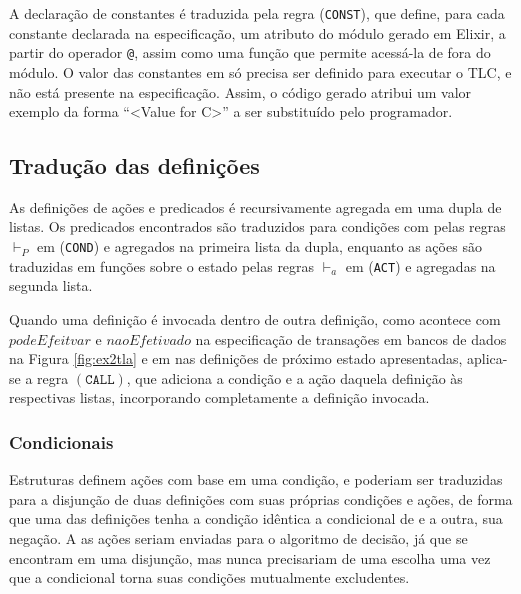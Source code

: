 A declaração de constantes é traduzida pela regra (\texttt{CONST}), que define,
para cada constante declarada na especificação, um atributo do módulo gerado em
Elixir, a partir do operador \texttt{@}, assim como uma função que permite acessá-la de
fora do módulo. O valor das constantes em \TLA só precisa ser definido para
executar o TLC, e não está presente na especificação. Assim, o código gerado
atribui um valor exemplo da forma ``<Value for C>'' a ser substituído pelo programador.


\subsection{Tradução das definições}

As definições de ações e predicados é recursivamente agregada em uma dupla de
listas. Os predicados encontrados são traduzidos para condições com pelas regras
$\vdash_P$ em (\texttt{COND}) e agregados na primeira lista da dupla, enquanto as ações são
traduzidas em funções sobre o estado pelas regras $\vdash_a$ em (\texttt{ACT}) e agregadas na
segunda lista.

Quando uma definição é invocada dentro de outra definição, como acontece com
$podeEfeitvar$ e $naoEfetivado$ na especificação de transações em bancos de
dados na Figura \ref{fig:ex2tla} e em nas definições de próximo estado apresentadas, aplica-se a regra
$(\texttt{CALL})$, que adiciona a condição e a ação daquela definição às
respectivas listas, incorporando completamente a definição invocada.



\subsubsection{Condicionais}

Estruturas \IF definem ações com base em uma condição, e poderiam ser traduzidas
para a disjunção de duas definições com suas próprias condições e ações, de forma que uma das
definições tenha a condição idêntica a condicional de \IF e a outra, sua
negação. A as ações seriam enviadas para o algoritmo de decisão, já que se
encontram em uma disjunção, mas nunca precisariam de uma escolha uma vez que a
condicional torna suas condições mutualmente excludentes.


